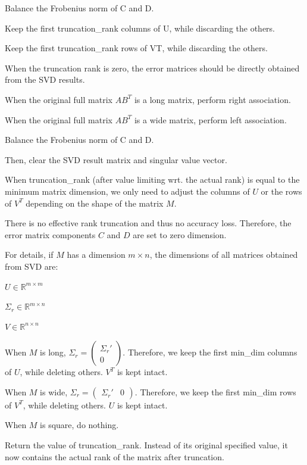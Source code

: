 \begin{DoxyDescription}
Balance the Frobenius norm of {\ttfamily C} and {\ttfamily D}.


\begin{DoxyEnumerate}
\item Keep the first {\ttfamily truncation\+\_\+rank} columns of {\ttfamily U}, while discarding the others.
\item Keep the first {\ttfamily truncation\+\_\+rank} rows of {\ttfamily VT}, while discarding the others.
\end{DoxyEnumerate}

When the truncation rank is zero, the error matrices should be directly obtained from the S\+VD results.

When the original full matrix $AB^T$ is a long matrix, perform right association.

When the original full matrix $AB^T$ is a wide matrix, perform left association.

Balance the Frobenius norm of {\ttfamily C} and {\ttfamily D}.

Then, clear the S\+VD result matrix and singular value vector.

When {\ttfamily truncation\+\_\+rank} (after value limiting wrt. the actual rank) is equal to the minimum matrix dimension, we only need to adjust the columns of $U$ or the rows of $V^T$ depending on the shape of the matrix $M$.

There is no effective rank truncation and thus no accuracy loss. Therefore, the error matrix components $C$ and $D$ are set to zero dimension.

For details, if $M$ has a dimension $m \times n$, the dimensions of all matrices obtained from S\+VD are\+:
\begin{DoxyItemize}
\item $U \in \mathbb{R}^{m \times m}$
\item $\Sigma_r \in \mathbb{R}^{m \times n}$
\item $V \in \mathbb{R}^{n \times n}$
\end{DoxyItemize}

When $M$ is long, $\Sigma_r = \begin{pmatrix}\Sigma_r' \\ 0 \end{pmatrix}$. Therefore, we keep the first {\ttfamily min\+\_\+dim} columns of $U$, while deleting others. $V^T$ is kept intact.

When $M$ is wide, $\Sigma_r = \begin{pmatrix} \Sigma_r' & 0 \end{pmatrix}$. Therefore, we keep the first {\ttfamily min\+\_\+dim} rows of $V^T$, while deleting others. $U$ is kept intact.

When $M$ is square, do nothing.

Return the value of {\ttfamily truncation\+\_\+rank}. Instead of its original specified value, it now contains the actual rank of the matrix after truncation.


\end{DoxyDescription}

